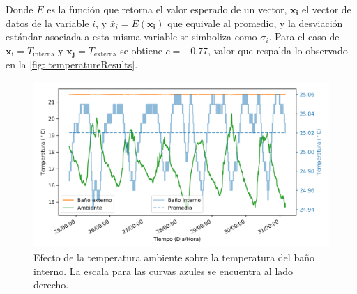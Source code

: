	Donde $E$ es la funci\'on que retorna el valor esperado de un vector, $\mathbf{x_i}$ el vector de datos de la variable $i$, y $\bar{x}_i = E(\mathbf{x_i})$ que equivale al promedio, y la desviaci\'on est\'andar asociada a esta misma variable se simboliza como $\sigma_i$. Para el caso de $\mathbf{x_i} = T_\text{interna}$ y $\mathbf{x_j} = T_\text{externa}$ se obtiene $c = -0.77$, valor que respalda lo observado en la \autoref{fig: temperatureResults}.
	
	\begin{figure}[h]
		\centering
		\includegraphics[width=\linewidth]{../Data/TemperatureStability/temperatureStability}
		\caption{Efecto de la temperatura ambiente sobre la temperatura del baño interno. La escala para las curvas azules se encuentra al lado derecho.}
		\label{fig: temperatureResults}
	\end{figure}